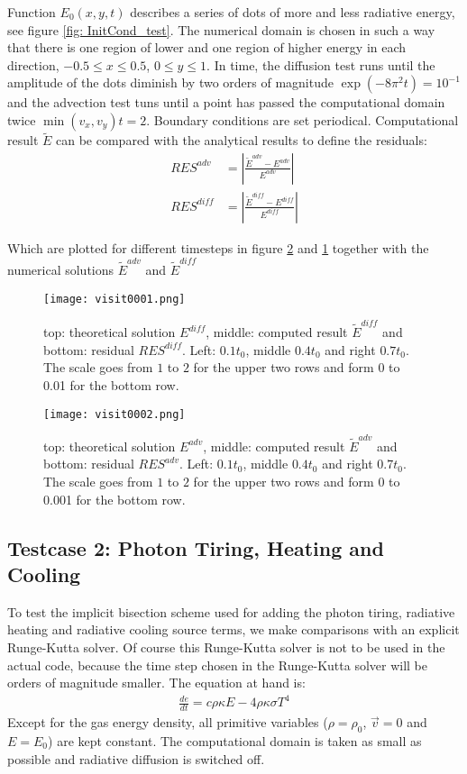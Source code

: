 Function $E_0(x,y,t)$ describes a series of dots of more and less radiative energy, see figure \ref{fig: InitCond_test}. The numerical domain is chosen in such a way that there is one region of lower and one region of higher energy in each direction, $-0.5 \leq x \leq 0.5$, $0 \leq y \leq 1$. In time, the diffusion test runs until the amplitude of the dots diminish by two orders of magnitude $\exp(-8 \pi^2 t)  = 10^{-1}$ and the advection test tuns until a point has passed the computational domain twice $ \min(v_x, v_y) t = 2 $. Boundary conditions are set periodical. Computational result $\tilde{E}$ can be compared with the analytical results to define the residuals:
\begin{align}
RES^{adv} &= \left|\frac{\tilde{E}^{adv} - E^{adv}}{E^{adv}}\right| \\
RES^{diff} &= \left|\frac{\tilde{E}^{diff} - E^{diff}}{E^{diff}}\right| 
\end{align}

Which are plotted for different timesteps in figure \ref{fig: test_advection} and \ref{fig: test_diffusion} together with the numerical solutions $\tilde{E}^{adv}$ and $\tilde{E}^{diff}$


\begin{figure}
\texttt{[image: visit0001.png]}
\label{fig: test_diffusion}
\caption{top: theoretical solution $E^{diff}$, middle: computed result $\tilde{E}^{diff}$ and bottom: residual $RES^{diff}$. Left: $0.1 t_0$, middle $0.4 t_0$ and right $0.7 t_0$. The scale goes from $1$ to $2$ for the upper two rows and form 0 to 0.01 for the bottom row.}
\end{figure}

\begin{figure}
\texttt{[image: visit0002.png]}
\label{fig: test_advection}
\caption{top: theoretical solution $E^{adv}$, middle: computed result $\tilde{E}^{adv}$ and bottom: residual $RES^{adv}$. Left: $0.1 t_0$, middle $0.4 t_0$ and right $0.7 t_0$. The scale goes from $1$ to $2$ for the upper two rows and form 0 to 0.001 for the bottom row.}
\end{figure}



\subsection{Testcase 2: Photon Tiring, Heating and Cooling}
To test the implicit bisection scheme used for adding the photon tiring, radiative heating and radiative cooling source terms, we make comparisons with an explicit Runge-Kutta solver. Of course this Runge-Kutta solver is not to be used in the actual code, because the time step chosen in the Runge-Kutta solver will be orders of magnitude smaller. The equation at hand is:
\begin{align}
\frac{d e}{dt} = c \rho \kappa E - 4 \rho \kappa \sigma T^4
\end{align}
Except for the gas energy density, all primitive variables ($\rho = \rho_0$, $\vec{v} = 0$ and $E = E_0$) are kept constant. The computational domain is taken as small as possible and radiative diffusion is switched off. \\

